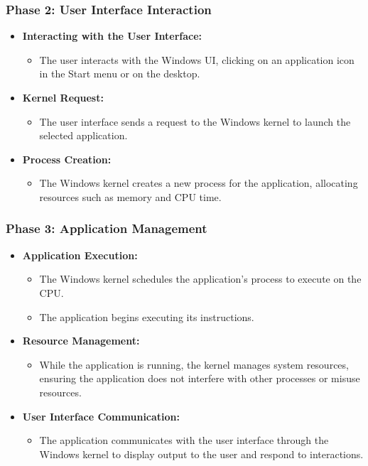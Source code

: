 \subsubsection{Phase 2: User Interface Interaction}
\begin{itemize}
    \item \textbf{Interacting with the User Interface:}
    \begin{itemize}
        \item The user interacts with the Windows UI, clicking on an application icon in the Start menu or on the desktop.
    \end{itemize}
    \item \textbf{Kernel Request:}
    \begin{itemize}
        \item The user interface sends a request to the Windows kernel to launch the selected application.
    \end{itemize}
    \item \textbf{Process Creation:}
    \begin{itemize}
        \item The Windows kernel creates a new process for the application, allocating resources such as memory and CPU time.
    \end{itemize}
\end{itemize}

\subsubsection{Phase 3: Application Management}
\begin{itemize}
\item \textbf{Application Execution:}
\begin{itemize}
\item The Windows kernel schedules the application’s process to execute on the CPU.
\item The application begins executing its instructions.
\end{itemize}
\item \textbf{Resource Management:}
\begin{itemize}
\item While the application is running, the kernel manages system resources, ensuring the application does not interfere with other processes or misuse resources.
\end{itemize}
\item \textbf{User Interface Communication:}
\begin{itemize}
\item The application communicates with the user interface through the Windows kernel to display output to the user and respond to interactions.
\end{itemize}
\end{itemize}


